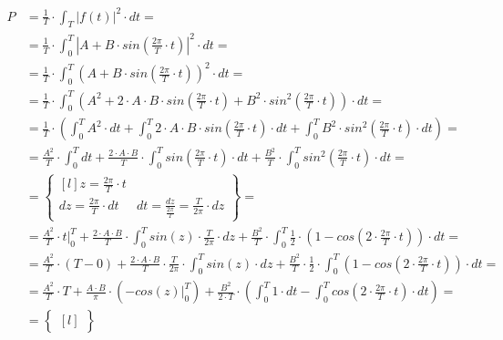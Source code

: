 \begin{task}
\begin{align*}
P&=\frac{1}{T} \cdot \int_{T}^{}\left|f(t)\right|^2 \cdot dt=\\
 &=\frac{1}{T} \cdot \int_{0}^{T}\left|A + B \cdot sin\left(\frac{2\pi}{T}\cdot t \right) \right|^2 \cdot dt=\\ 
 &=\frac{1}{T} \cdot \int_{0}^{T}\left(A + B \cdot sin\left(\frac{2\pi}{T}\cdot t \right) \right)^2 \cdot dt=\\ 
 &=\frac{1}{T} \cdot \int_{0}^{T}\left(A^2 + 2\cdot A \cdot B \cdot sin\left(\frac{2\pi}{T}\cdot t \right) + B^2 \cdot sin^2\left(\frac{2\pi}{T}\cdot t \right) \right) \cdot dt=\\
 &=\frac{1}{T} \cdot \left( \int_{0}^{T}A^2 \cdot dt + \int_{0}^{T} 2\cdot A \cdot B \cdot sin\left(\frac{2\pi}{T}\cdot t \right) \cdot dt + \int_{0}^{T} B^2 \cdot sin^2\left(\frac{2\pi}{T}\cdot t \right)  \cdot dt \right)=\\
 &=\frac{A^2}{T} \cdot \int_{0}^{T} dt + \frac{2\cdot A \cdot B}{T} \cdot \int_{0}^{T} sin\left(\frac{2\pi}{T}\cdot t \right) \cdot dt + \frac{B^2}{T} \cdot \int_{0}^{T}  sin^2\left(\frac{2\pi}{T}\cdot t \right)  \cdot dt=\\
 &=\begin{Bmatrix*}[l]
 z=\frac{2\pi}{T} \cdot t\\
 dz = \frac{2\pi}{T} \cdot dt & dt = \frac{dz}{\frac{2\pi}{T}} =\frac{T}{2\pi} \cdot dz 
 \end{Bmatrix*}=\\
 &=\frac{A^2}{T} \cdot \left. t \right|_{0}^{T} + \frac{2\cdot A \cdot B}{T} \cdot \int_{0}^{T} sin\left(z \right) \cdot \frac{T}{2\pi} \cdot dz + \frac{B^2}{T} \cdot \int_{0}^{T} \frac{1}{2} \cdot \left(1 - cos\left(2 \cdot \frac{2\pi}{T}\cdot t \right) \right)  \cdot dt=\\
 &=\frac{A^2}{T} \cdot \left( T - 0 \right) + \frac{2\cdot A \cdot B}{T} \cdot \frac{T}{2\pi} \cdot \int_{0}^{T} sin\left(z \right) \cdot dz + \frac{B^2}{T} \cdot \frac{1}{2} \cdot \int_{0}^{T} \left(1 - cos\left(2 \cdot \frac{2\pi}{T}\cdot t \right) \right)  \cdot dt=\\
 &=\frac{A^2}{T} \cdot T + \frac{A \cdot B}{\pi} \cdot \left( \left.-cos\left(z \right)\right|_{0}^{T}  \right) + \frac{B^2}{2 \cdot T} \cdot \left( \int_{0}^{T} 1 \cdot dt - \int_{0}^{T} cos\left(2 \cdot \frac{2\pi}{T}\cdot t \right)  \cdot dt \right)=\\
 &=\begin{Bmatrix*}[l]

\end{Bmatrix*}
\end{align*}
\end{task}
